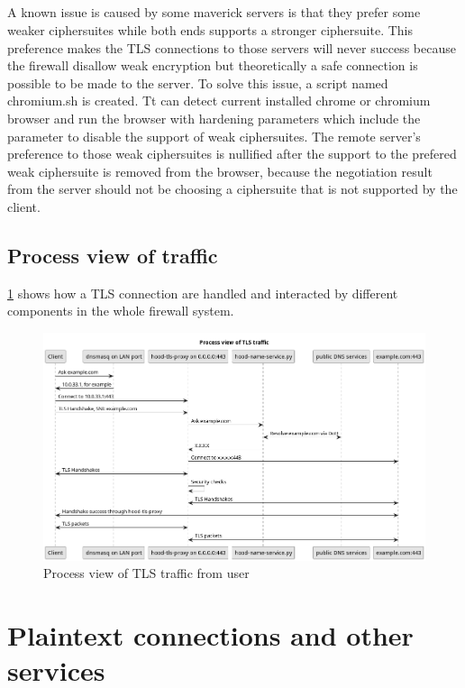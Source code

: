 \documentclass[mscthesis]{usiinfthesis}
\begin{document}
\paragraph{}
A known issue is caused by some maverick servers is that they prefer some weaker ciphersuites while both ends supports a stronger ciphersuite. This preference makes the TLS connections to those servers will never success because the firewall disallow weak encryption but theoretically a safe connection is possible to be made to the server. To solve this issue, a script named chromium.sh is created. Tt can detect current installed chrome or chromium browser and run the browser with hardening parameters which include the parameter to disable the support of weak ciphersuites. The remote server's preference to those weak ciphersuites is nullified after the support to the prefered weak ciphersuite is removed from the browser, because the negotiation result from the server should not be choosing a ciphersuite that is not supported by the client.

\section{Process view of traffic}
\cref{fig:tls-process-view} shows how a TLS connection are handled and interacted by different components in the whole firewall system.
\begin{figure}[H]
  \includegraphics[width=\textheight, angle=90]{graphics/puml/process-tls-traffic.png}
  \caption{Process view of TLS traffic from user}
  \label{fig:tls-process-view}
\end{figure}

\chapter{Plaintext connections and other services}\label{cha:plaintext}
\end{document}
